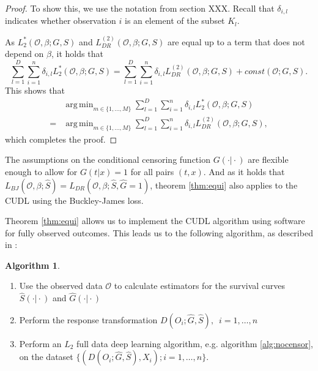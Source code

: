 \documentclass[12pt, a4paper]{article}
\theoremstyle{definition}
\newtheorem{Algorithm}{Algorithm}[section]
\theoremstyle{plain}
\numberwithin{equation}{section}
\numberwithin{figure}{section}
\numberwithin{table}{section}
\DeclareMathOperator*{\argmin}{arg\,min}
\begin{document}
\begin{proof}
		To show this, we use the notation from section XXX.
		Recall that $\delta_{i,l}$ indicates whether observation $i$ is an element of the subset $K_l$.
		
		As $L_2^*(\mathcal{O}, \beta; G,S)$ and $L_{DR}^{(2)}(\mathcal{O}, \beta; G,S)$ are equal up to a term that does not depend on $\beta$, it holds that
		\begin{equation*}
		\sum_{l=1}^{D} \sum_{i=1}^{n} \delta_{i,l} L_2^*(\mathcal{O}, \beta; G,S) = \sum_{l=1}^{D} \sum_{i=1}^{n} \delta_{i,l} L_{DR}^{(2)}(\mathcal{O}, \beta; G,S) + const(\mathcal{O}; G,S).
		\end{equation*}
		This shows that
		\begin{equation*}
		\begin{split}
		 &\argmin_{m \in \{1,\dots, M\}}\sum_{l=1}^{D} \sum_{i=1}^{n} \delta_{i,l} L_2^*(\mathcal{O}, \beta; G,S)\\
		  = &\argmin_{m \in \{1,\dots, M\}}\sum_{l=1}^{D} \sum_{i=1}^{n} \delta_{i,l} L_{DR}^{(2)}(\mathcal{O}, \beta; G,S),
		 \end{split}
		\end{equation*}
		which completes the proof.
	\end{proof}

	The assumptions on the conditional censoring function $G(\cdot\vert\cdot)$ are flexible enough to allow for $G(t\vert x)=1$ for all pairs $(t,x)$.
	And as it holds that $L_{BJ}(\mathcal{O}, \beta; \hat{S})=L_{DR}(\mathcal{O}, \beta; \hat{S}, \hat{G} = 1)$, theorem \ref{thm:equi} also applies to the CUDL using the Buckley-James loss.
	
	Theorem \ref{thm:equi} allows us to implement the CUDL algorithm using software for fully observed outcomes.
	This leads us to the following algorithm, as described in \citet*{basearticle}:
	\begin{Algorithm}\label{alg:censor}~
		\begin{enumerate}
			\item Use the observed data $\mathcal{O}$ to calculate estimators for the survival curves $\hat{S}(\cdot\vert\cdot)$ and $\hat{G}(\cdot\vert\cdot)$
			\item Perform the response transformation $D(O_i; \hat{G},\hat{S}),$~$ i = 1,\dots,n$
			\item Perform an $L_2$ full data deep learning algorithm, e.g. algorithm \ref{alg:nocensor}, on the dataset $\{(D(O_i; \hat{G},\hat{S}), X_i); i = 1,\dots,n\}$.
		\end{enumerate}
	\end{Algorithm}
\end{document}
